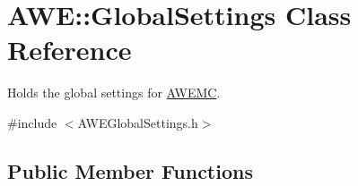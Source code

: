 \hypertarget{class_a_w_e_1_1_global_settings}{\section{A\-W\-E\-:\-:Global\-Settings Class Reference}
\label{class_a_w_e_1_1_global_settings}
}


Holds the global settings for \hyperlink{class_a_w_e_1_1_a_w_e_m_c}{A\-W\-E\-M\-C}.  




{\ttfamily \#include $<$A\-W\-E\-Global\-Settings.\-h$>$}

\subsection*{Public Member Functions}

